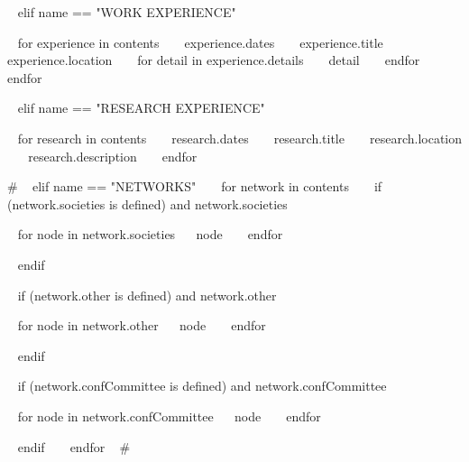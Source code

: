 \begin{minipage}{\textwidth}

~{ elif name == "WORK EXPERIENCE" }~
\begin{entrylist}
~{ for experience in contents }~
  \entry
    {~{{ experience.dates }}~}
    {~{{ experience.title }}~}
    {~{{ experience.location }}~}
    {~{ for detail in experience.details }~ ~{{ detail }}~ ~{ endfor }~}
~{ endfor }~
\end{entrylist}
  


~{ elif name == "RESEARCH EXPERIENCE" }~
\begin{entrylist}
~{ for research in contents }~
  \entry
    {~{{ research.dates }}~}
    {~{{ research.title }}~}
    {~{{ research.location }}~}
    {~{{ research.description }}~}
~{ endfor }~
\end{entrylist}

 {#
~{ elif name == "NETWORKS" }~
~{ for network in contents }~
  ~{ if (network.societies is defined) and network.societies }~
  \begin{entrylist}[.1]
    ~{ for node in network.societies}~
     \networkentry
      {}
      {~{{ node }}~}
    ~{ endfor }~
  \end{entrylist}
  ~{ endif }~

  ~{ if (network.other is defined) and network.other }~
  \begin{entrylist}[.1]
    ~{ for node in network.other}~
     \networkentry
      {}
      {~{{ node }}~}
    ~{ endfor }~
  \end{entrylist}
  ~{ endif }~

  ~{ if (network.confCommittee is defined) and network.confCommittee }~
  \begin{entrylist}[.1]
    ~{ for node in network.confCommittee}~
     \networkentry
      {}
      {~{{ node }}~}
    ~{ endfor }~
  \end{entrylist}
  ~{ endif }~
~{ endfor }~
#}


\end{minipage}
